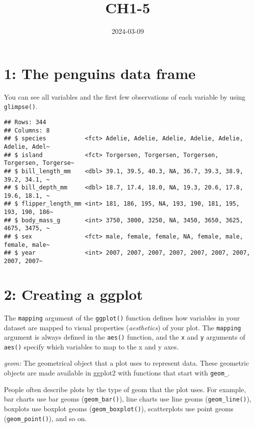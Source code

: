 \documentclass[
]{article}
\title{CH1-5}
\author{}
\date{\vspace{-2.5em}2024-03-09}
\begin{document}
\maketitle

\hypertarget{the-penguins-data-frame}{%
\section{1: The penguins data frame}\label{the-penguins-data-frame}}

You can see all variables and the first few observations of each
variable by using \texttt{glimpse()}.

\begin{verbatim}
## Rows: 344
## Columns: 8
## $ species           <fct> Adelie, Adelie, Adelie, Adelie, Adelie, Adelie, Adel~
## $ island            <fct> Torgersen, Torgersen, Torgersen, Torgersen, Torgerse~
## $ bill_length_mm    <dbl> 39.1, 39.5, 40.3, NA, 36.7, 39.3, 38.9, 39.2, 34.1, ~
## $ bill_depth_mm     <dbl> 18.7, 17.4, 18.0, NA, 19.3, 20.6, 17.8, 19.6, 18.1, ~
## $ flipper_length_mm <int> 181, 186, 195, NA, 193, 190, 181, 195, 193, 190, 186~
## $ body_mass_g       <int> 3750, 3800, 3250, NA, 3450, 3650, 3625, 4675, 3475, ~
## $ sex               <fct> male, female, female, NA, female, male, female, male~
## $ year              <int> 2007, 2007, 2007, 2007, 2007, 2007, 2007, 2007, 2007~
\end{verbatim}

\hypertarget{creating-a-ggplot}{%
\section{2: Creating a ggplot}\label{creating-a-ggplot}}

The \texttt{mapping} argument of the \texttt{ggplot()} function defines
how variables in your dataset are mapped to visual properties
(\emph{aesthetics}) of your plot. The \texttt{mapping} argument is
always defined in the \texttt{aes()} function, and the \texttt{x} and
\texttt{y} arguments of \texttt{aes()} specify which variables to map to
the x and y axes.

\emph{geom:} The geometrical object that a plot uses to represent data.
These geometric objects are made available in ggplot2 with functions
that start with \texttt{geom\_}.

People often describe plots by the type of geom that the plot uses. For
example, bar charts use bar geoms (\texttt{geom\_bar()}), line charts
use line geoms (\texttt{geom\_line()}), boxplots use boxplot geoms
(\texttt{geom\_boxplot()}), scatterplots use point geoms
(\texttt{geom\_point()}), and so on.
\end{document}
